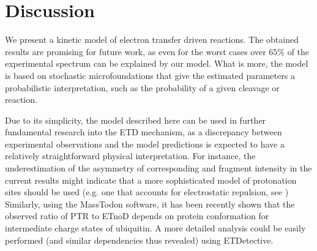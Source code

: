 \documentclass{llncs}
\begin{document}
%
%
\section{Discussion}
        We present a kinetic model of electron transfer driven reactions. The obtained results are promising for future work, as even for the worst cases over $65\%$ of the experimental spectrum can be explained by our model. What is more, the model is based on stochastic microfoundations that give the estimated parameters a probabilistic interpretation, such as the probability of a given cleavage or reaction.

        Due to its simplicity, the model described here can be used in further fundamental research into the ETD mechanism, as a discrepancy between experimental observations and the model predictions is expected to have a relatively straightforward physical interpretation. For instance, the underestimation of the asymmetry of corresponding  and  fragment intensity in the current results might indicate that a more sophisticated model of protonation sites should be used (e.g. one that accounts for electrostatic repulsion, see \cite{Morrison2016-wc}) Similarly, using the MassTodon software, it has been recently shown \cite{Lermyte2017-zt} that the observed ratio of PTR to ETnoD depends on protein conformation for intermediate charge states of ubiquitin. A more detailed  analysis could be easily performed (and similar dependencies thus revealed) using ETDetective.
\end{document}
